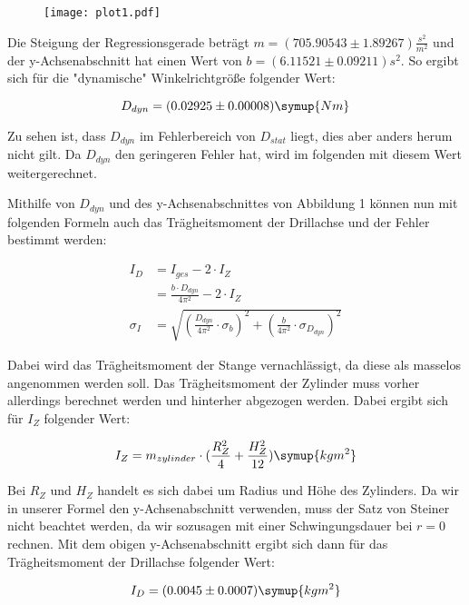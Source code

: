 \begin{figure}
  \texttt{[image: plot1.pdf]}
\end{figure}

Die Steigung der Regressionsgerade beträgt $m = (705.90543 \pm 1.89267) \frac{s^2}{m^2}$ und
der y-Achsenabschnitt hat einen Wert von $b = (6.11521 \pm 0.09211) s^2$. So ergibt sich für
die "dynamische" Winkelrichtgröße folgender Wert:

\begin{equation}
  D_{dyn} = (0.02925 \pm 0.00008) \symup{Nm}
\end{equation}

Zu sehen ist, dass $D_{dyn}$ im Fehlerbereich von $D_{stat}$ liegt, dies aber anders herum nicht
gilt. Da $D_{dyn}$ den geringeren Fehler hat, wird im folgenden mit diesem Wert weitergerechnet.

Mithilfe von $D_{dyn}$ und des y-Achsenabschnittes von Abbildung 1 können nun mit folgenden Formeln
auch das Trägheitsmoment der Drillachse und der Fehler bestimmt werden:

\begin{align}
  I_D        &= I_{ges} - 2 \cdot I_{Z}\\
             &= \frac{b \cdot D_{dyn}}{4 \pi^2} - 2 \cdot I_{Z}\\
  \sigma_I   &= \sqrt{(\frac{D_{dyn}}{4\pi^2} \cdot \sigma_b)^2 + (\frac{b}{4\pi^2} \cdot \sigma_{D_{dyn}})^2}
\end{align}

Dabei wird das Trägheitsmoment der Stange vernachlässigt, da diese als masselos angenommen werden soll.
Das Trägheitsmoment der Zylinder muss vorher allerdings berechnet werden und hinterher abgezogen werden.
Dabei ergibt sich für $I_{Z}$ folgender Wert:

\begin{equation}
  I_Z = m_{zylinder} \cdot (\frac{R_Z^2}{4} + \frac{H_Z^2}{12}) \symup{kg m^2}
\end{equation}

Bei $R_Z$ und $H_Z$ handelt es sich dabei um Radius und Höhe des Zylinders. Da wir in unserer Formel
den y-Achsenabschnitt verwenden, muss der Satz von Steiner nicht beachtet werden, da wir sozusagen
mit einer Schwingungsdauer bei $r=0$ rechnen. Mit dem obigen y-Achsenabschnitt ergibt sich dann
für das Trägheitsmoment der Drillachse folgender Wert:

\begin{equation}
  I_D = (0.0045 \pm 0.0007) \symup{kg m^2}
\end{equation}

